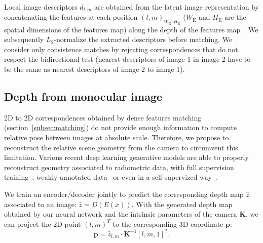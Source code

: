 Local image descriptors $d_{l,m}$ are obtained from the latent image representation by concatenating the features at each position $\left( l, m \right)_{W_\mathrm{E},H_\mathrm{E}}$ ($W_\mathrm{E}$ and $H_\mathrm{E}$ are the spatial dimensions of the features map) along the depth of the features map~\citep{Taira2018, Widya2018}. We subsequently $L_2$-normalize the extracted descriptors before matching. We consider only consistence matches by rejecting correspondences that do not respect the bidirectional test (nearest descriptors of image 1 in image 2 have to be the same as nearest descriptors of image 2 to image 1).

\subsection{Depth from monocular image}
\label{subsec:depth_map}
2D to 2D correspondences obtained by dense features matching (section~\ref{subsec:matching}) do not provide enough information to compute relative pose between images at absolute scale. Therefore, we propose to reconstruct the relative scene geometry from the camera to circumvent this limitation. Various recent deep learning generative models are able to properly reconstruct geometry associated to radiometric data, with full supervision training~\cite{Eigen2014}, weakly annotated data~\cite{Godard2017} or even in a self-supervized way~\cite{Mahjourian2018}. 

We train an encoder/decoder jointly to predict the corresponding depth map $\hat{z}$ associated to an image: $\hat{z} = D(E(x))$. With the generated depth map obtained by our neural network and the intrinsic parameters of the camera $\mathbf{K}$, we can project the 2D point $\left( l, m \right)^T$ to the corresponding 3D coordinate $\mathbf{p}$:
\begin{equation}
	\label{eq:3d_proj}
	\mathbf{p} = \hat{z}_{l, m} \cdot \mathbf{K}^{-1}[l, m, 1]^T.
\end{equation}